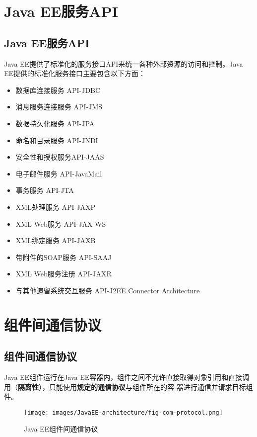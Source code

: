 \section{Java EE服务API}

\subsection{Java EE服务API} 

Java EE提供了标准化的服务接口API来统一各种外部资源的访问和控制。Java EE提供的标准化服务接口主要包含以下方面：

\begin{itemize}
\item 数据库连接服务 API-JDBC
\item 消息服务连接服务 API-JMS
\item 数据持久化服务 API-JPA
\item 命名和目录服务 API-JNDI
\item 安全性和授权服务API-JAAS
\item 电子邮件服务 API-JavaMail
\item 事务服务 API-JTA
\item XML处理服务 API-JAXP
\item XML Web服务 API-JAX-WS
\item XML绑定服务 API-JAXB
\item 带附件的SOAP服务 API-SAAJ
\item XML Web服务注册 API-JAXR
\item 与其他遗留系统交互服务 API-J2EE Connector Architecture
\end{itemize}

\section{组件间通信协议}

\subsection{组件间通信协议} 

Java EE组件运行在Java EE容器内，组件之间不允许直接取得对象引用和直接调
用（{\bf\Red 隔离性}），只能使用{\bf\Red 规定的通信协议}与组件所在的容
器进行通信并请求目标组件。

\begin{figure}[htb]
\centering
\texttt{[image: images/JavaEE-architecture/fig-com-protocol.png]}
\caption{Java EE组件间通信协议}
\label{fig:javaee-com-protocol}
\end{figure}

